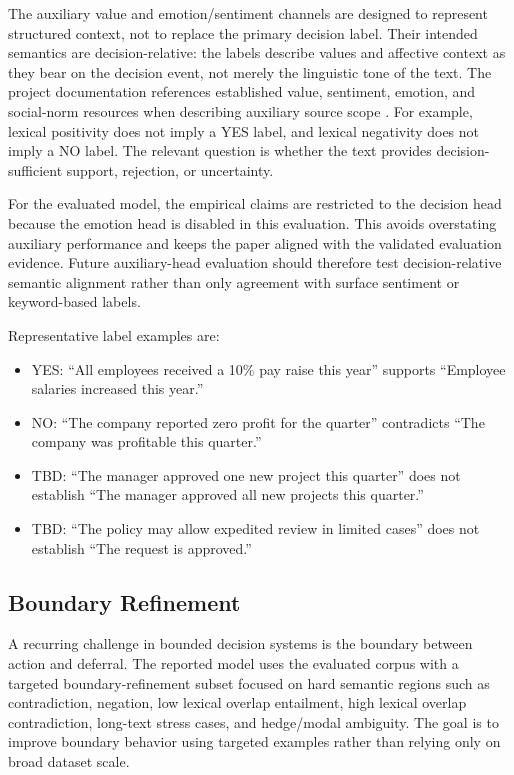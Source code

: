 \documentclass[11pt]{article}
\begin{document}
The auxiliary value and emotion/sentiment channels are designed to represent structured context, not to replace the primary decision label. Their intended semantics are decision-relative: the labels describe values and affective context as they bear on the decision event, not merely the linguistic tone of the text. The project documentation references established value, sentiment, emotion, and social-norm resources when describing auxiliary source scope \cite{schwartz2012overview,rosenthal2017semeval,malo2014good,barbieri2020tweeteval,demszky2020goemotions,ziems2023normbank,hoover2020mftc,poria2019meld,rashkin2019empathetic,sap2020socialbias,hendrycks2021ethics,go2009twitter,maas2011learning}. For example, lexical positivity does not imply a YES label, and lexical negativity does not imply a NO label. The relevant question is whether the text provides decision-sufficient support, rejection, or uncertainty.

For the evaluated model, the empirical claims are restricted to the decision head because the emotion head is disabled in this evaluation. This avoids overstating auxiliary performance and keeps the paper aligned with the validated evaluation evidence. Future auxiliary-head evaluation should therefore test decision-relative semantic alignment rather than only agreement with surface sentiment or keyword-based labels.

Representative label examples are:
\begin{itemize}[leftmargin=1.5em]
  \item YES: ``All employees received a 10\% pay raise this year'' supports ``Employee salaries increased this year.''
  \item NO: ``The company reported zero profit for the quarter'' contradicts ``The company was profitable this quarter.''
  \item TBD: ``The manager approved one new project this quarter'' does not establish ``The manager approved all new projects this quarter.''
  \item TBD: ``The policy may allow expedited review in limited cases'' does not establish ``The request is approved.''
\end{itemize}

\subsection{Boundary Refinement}

A recurring challenge in bounded decision systems is the boundary between action and deferral. The reported model uses the evaluated corpus with a targeted boundary-refinement subset focused on hard semantic regions such as contradiction, negation, low lexical overlap entailment, high lexical overlap contradiction, long-text stress cases, and hedge/modal ambiguity. The goal is to improve boundary behavior using targeted examples rather than relying only on broad dataset scale.
\end{document}
